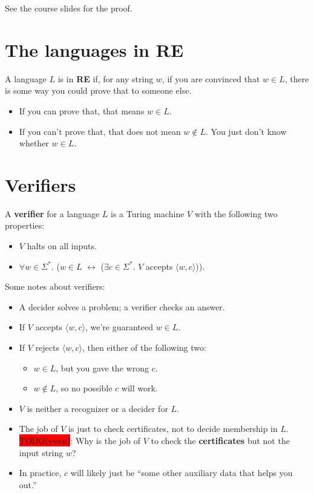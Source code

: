 \documentclass[12pt, letterpaper, oneside]{book}
\begin{document}
See the course slides for the proof.

\section{The languages in RE}

A language $L$ is in \textbf{RE} if, for any string $w$, if you are convinced that $w \in L$, there is some way you
could prove that to someone else.
\begin{itemize}
  \item If you can prove that, that means $w \in L$.
  \item If you can't prove that, that does not mean $w \notin L$. You just don't know whether $w \in L$.
\end{itemize}

\section{Verifiers}

A \textbf{verifier} for a language $L$ is a Turing machine $V$ with the following two properties:
\begin{itemize}
  \item $V$ halts on all inputs.
  \item $\forall w \in \Sigma^*.$ ($w \in L$ $\leftrightarrow$ ($\exists c \in \Sigma^*.$ $V$ accepts $\langle w,
          c\rangle$)).
\end{itemize}

Some notes about verifiers:
\begin{itemize}
  \item A decider solves a problem; a verifier checks an answer.
  \item If $V$ accepts $\langle w, c \rangle$, we're guaranteed $w \in L$.
  \item If $V$ rejects $\langle w, c \rangle$, then either of the following two:
        \begin{itemize}
          \item $w \in L$, but you gave the wrong $c$.
          \item $w \notin L$, so no possible $c$ will work.
        \end{itemize}
  \item $V$ is neither a recognizer or a decider for $L$.
  \item The job of $V$ is just to check certificates, not to decide membership in $L$. \colorbox{red}{TODO(ywen)}: Why
        is the job of $V$ to check the \textbf{certificates} but not the input string $w$?
  \item In practice, $c$ will likely just be ``some other auxiliary data that helps you out.''
\end{itemize}
\end{document}

